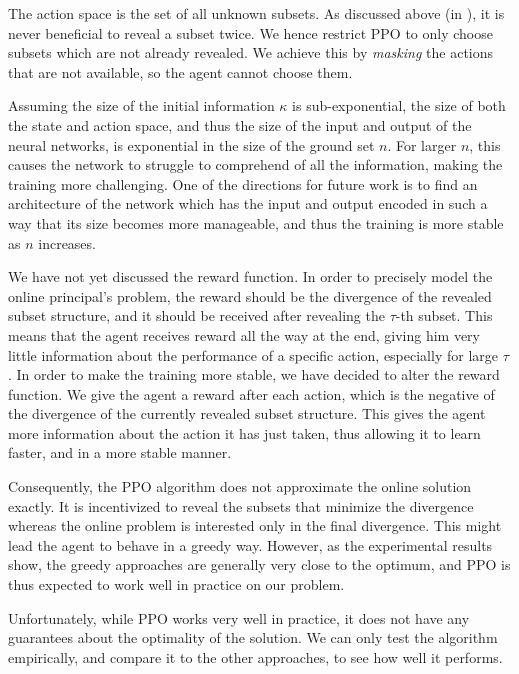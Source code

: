The action space is the set of all unknown subsets.
As discussed above (in ), it is never beneficial to reveal a subset twice.
We hence restrict PPO to only choose subsets which are not already revealed.
We achieve this by \emph{masking} the actions that are not available, so the agent cannot choose them.

Assuming the size of the initial information $ \kappa $ is sub-exponential, the size of both the state and action space, and thus the size of the input and output of the neural networks, is exponential in the size of the ground set $ n $.
For larger $ n $, this causes the network to struggle to comprehend of all the information, making the training more challenging.
One of the directions for future work is to find an architecture of the network which has the input and output encoded in such a way that its size becomes more manageable, and thus the training is more stable as $ n $ increases.

We have not yet discussed the reward function.
In order to precisely model the online principal's problem, the reward should be the divergence of the revealed subset structure, and it should be received after revealing the $ \tau $-th subset.
This means that the agent receives reward all the way at the end, giving him very little information about the performance of a specific action, especially for large $ \tau $.
In order to make the training more stable, we have decided to alter the reward function.
We give the agent a reward after each action, which is the negative of the divergence of the currently revealed subset structure.
This gives the agent more information about the action it has just taken, thus allowing it to learn faster, and in a more stable manner.

Consequently, the PPO algorithm does not approximate the online solution exactly.
It is incentivized to reveal the subsets that minimize the divergence  whereas the online problem is interested only in the final divergence.
This might lead the agent to behave in a greedy way.
However, as the experimental results show, the greedy approaches are generally very close to the optimum, and PPO is thus expected to work well in practice on our problem.

Unfortunately, while PPO works very well in practice, it does not have any guarantees about the optimality of the solution.
We can only test the algorithm empirically, and compare it to the other approaches, to see how well it performs.
